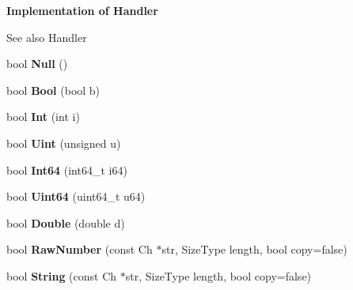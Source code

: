 \begin{Indent}{\bf Implementation of Handler}\par
{\em \begin{DoxySeeAlso}{See also}
Handler 
\end{DoxySeeAlso}
}\begin{DoxyCompactItemize}
\item 
bool {\bfseries Null} ()\hypertarget{class_pretty_writer_aa144f2d0f0c3c69248cdbe957349528c}{}\label{class_pretty_writer_aa144f2d0f0c3c69248cdbe957349528c}

\item 
bool {\bfseries Bool} (bool b)\hypertarget{class_pretty_writer_a6e765ee7ada5ed40f317c78a98f6f90b}{}\label{class_pretty_writer_a6e765ee7ada5ed40f317c78a98f6f90b}

\item 
bool {\bfseries Int} (int i)\hypertarget{class_pretty_writer_aa1815263e61cb7af3b6dfba480a0f481}{}\label{class_pretty_writer_aa1815263e61cb7af3b6dfba480a0f481}

\item 
bool {\bfseries Uint} (unsigned u)\hypertarget{class_pretty_writer_a8c82302877a5588eae77eb7d042c49ef}{}\label{class_pretty_writer_a8c82302877a5588eae77eb7d042c49ef}

\item 
bool {\bfseries Int64} (int64\+\_\+t i64)\hypertarget{class_pretty_writer_ad42b797429f4ee19efdce610f5aff976}{}\label{class_pretty_writer_ad42b797429f4ee19efdce610f5aff976}

\item 
bool {\bfseries Uint64} (uint64\+\_\+t u64)\hypertarget{class_pretty_writer_aba75ac1f13c2629b2a55ffbf3d8a116c}{}\label{class_pretty_writer_aba75ac1f13c2629b2a55ffbf3d8a116c}

\item 
bool {\bfseries Double} (double d)\hypertarget{class_pretty_writer_ad9d592e86b985da666665926e87db415}{}\label{class_pretty_writer_ad9d592e86b985da666665926e87db415}

\item 
bool {\bfseries Raw\+Number} (const Ch $\ast$str, Size\+Type length, bool copy=false)\hypertarget{class_pretty_writer_a3941bc21d6a261ca8a86eff330db30ef}{}\label{class_pretty_writer_a3941bc21d6a261ca8a86eff330db30ef}

\item 
bool {\bfseries String} (const Ch $\ast$str, Size\+Type length, bool copy=false)\hypertarget{class_pretty_writer_ae544ccfe35dd7e80ed694873062409f6}{}\label{class_pretty_writer_ae544ccfe35dd7e80ed694873062409f6}


\end{DoxyCompactItemize}
\end{Indent}
